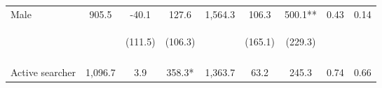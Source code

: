 \begin{tabular}{lcccccccc}
\noalign{\smallskip}Male & 905.5 & -40.1 & 127.6 & 1,564.3 & 106.3 & 500.1** & 0.43 & 0.14\\
 & \begin{footnotesize}\end{footnotesize} & \begin{footnotesize}(111.5)\end{footnotesize} & \begin{footnotesize}(106.3)\end{footnotesize} & \begin{footnotesize}\end{footnotesize} & \begin{footnotesize}(165.1)\end{footnotesize} & \begin{footnotesize}(229.3)\end{footnotesize} & \begin{footnotesize}\end{footnotesize} & \begin{footnotesize}\end{footnotesize}\\
 & \begin{footnotesize}\end{footnotesize} & \begin{footnotesize}[1.000]\end{footnotesize} & \begin{footnotesize}[0.071]\end{footnotesize} & \begin{footnotesize}\end{footnotesize} & \begin{footnotesize}[1.000]\end{footnotesize} & \begin{footnotesize}[0.181]\end{footnotesize} & \begin{footnotesize}\end{footnotesize} & \begin{footnotesize}\end{footnotesize}\\
\noalign{\smallskip}Active searcher & 1,096.7 & 3.9 & 358.3* & 1,363.7 & 63.2 & 245.3 & 0.74 & 0.66\\

\end{tabular}
